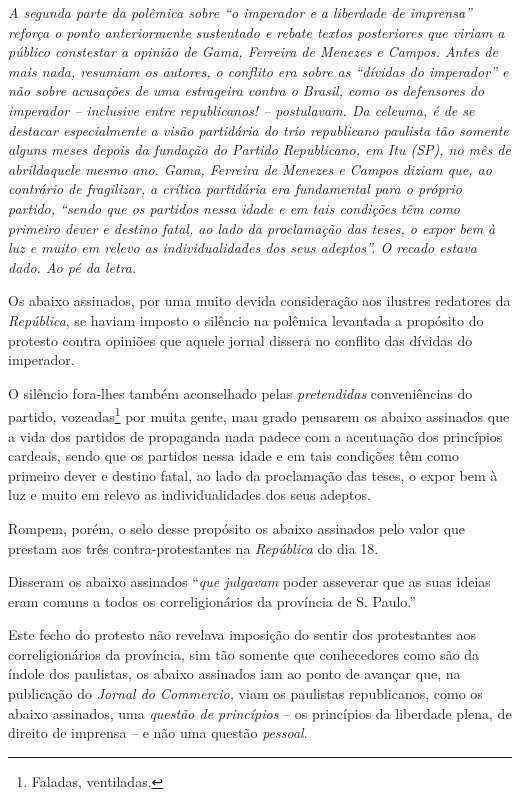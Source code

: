 \begin{didascalia}
\emph{A segunda parte da polêmica sobre ``o imperador e a liberdade de
imprensa'' reforça o ponto anteriormente sustentado e rebate textos
posteriores que viriam a público constestar a opinião de Gama, Ferreira
de Menezes e Campos. Antes de mais nada, resumiam os autores, o conflito
era sobre as ``dívidas do imperador'' e não sobre acusações de uma
estrageira contra o Brasil, como os defensores do imperador -- inclusive
entre republicanos! -- postulavam. Da celeuma, é de se destacar
especialmente a visão partidária do trio republicano paulista tão
somente alguns meses depois da fundação do Partido Republicano, em Itu
(SP), no mês de abrildaquele mesmo ano. Gama, Ferreira de Menezes e
Campos diziam que, ao contrário de fragilizar, a crítica partidária era
fundamental para o próprio partido, ``sendo que os partidos nessa idade e
em tais condições têm como primeiro dever e destino fatal, ao lado da
proclamação das teses, o expor bem à luz e muito em relevo as
individualidades dos seus adeptos''. O recado estava dado. Ao pé da
letra.}
\end{didascalia}

\asterisc{}

Os abaixo assinados, por uma muito devida consideração aos ilustres
redatores da \emph{República}, se haviam imposto o silêncio na polêmica
levantada a propósito do protesto contra opiniões que aquele jornal
dissera no conflito das dívidas do imperador.

O silêncio fora-lhes também aconselhado pelas \emph{pretendidas}
conveniências do partido, vozeadas\footnote{ Faladas, ventiladas.} por
muita gente, mau grado pensarem os abaixo assinados que a vida dos
partidos de propaganda nada padece com a acentuação dos princípios
cardeais, sendo que os partidos nessa idade e em tais condições têm como
primeiro dever e destino fatal, ao lado da proclamação das teses, o
expor bem à luz e muito em relevo as individualidades dos seus adeptos.

Rompem, porém, o selo desse propósito os abaixo assinados pelo valor que
prestam aos três contra-protestantes na \emph{República} do dia 18.

Disseram os abaixo assinados ``\emph{que julgavam} poder asseverar que as
suas ideias eram comuns a todos os correligionários da província de S.
Paulo.''

Este fecho do protesto não revelava imposição do sentir dos protestantes
aos correligionários da província, sim tão somente que conhecedores como
são da índole dos paulistas, os abaixo assinados iam ao ponto de avançar
que, na publicação do \emph{Jornal do Commercio,} viam os paulistas
republicanos, como os abaixo assinados, uma \emph{questão de princípios}
-- os princípios da liberdade plena, de direito de imprensa -- e não uma
questão \emph{pessoal}.

